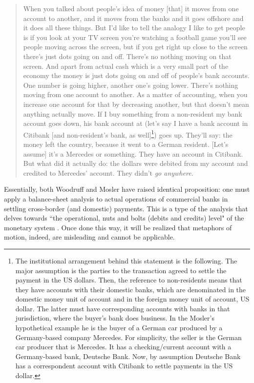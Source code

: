 \begin{quote}
When you talked about people's idea of money [that] it moves from one account to another, and it moves from the banks and it goes offshore and it does all these things. But I'd like to tell the analogy I like to get people is if you look at your TV screen you're watching a football game you'll see people moving across the screen, but if you get right up close to the screen there's just dots going on and off. There's no nothing moving on that screen. And apart from actual cash which is a very small part of the economy the money is just dots going on and off of people's bank accounts. One number is going higher, another one's going lower. There's nothing moving from one account to another. As a matter of accounting, when you increase one account for that by decreasing another, but that doesn't mean anything actually move. If I buy something from a non-resident my bank account goes down, his bank account at (let's say I have a bank account in Citibank [and non-resident's bank, as well]\footnote{The institutional arrangement behind this statement is the following. The major assumption is the parties to the transaction agreed to settle the payment in the US dollars. Then, the reference to non-residents means that they have accounts with their domestic banks, which are denominated in the domestic money unit of account and in the foreign money unit of account, US dollar. The latter must have corresponding accounts with banks in that jurisdiction, where the buyer's bank does business. In the Mosler's hypothetical example he is the buyer of a German car produced by a Germany-based company Mercedes. For simplicity, the seller is the German car producer that is Mercedes. It has a checking/current account with a Germany-based bank, Deutsche Bank. Now, by assumption Deutsche Bank has a correspondent account with Citibank to settle payments in the US dollar.}) goes up. They'll say: the money left the country, because it went to a German resident. [Let's assume] it's a Mercedes or something. They have an account in Citibank. But what did it actually do: the dollars were debited from my account and credited to Mercedes' account. They didn't \textit{go anywhere}. \citep[emphasis added]{mosler2023}
\end{quote}

Essentially, both Woodruff and Mosler have raised identical proposition: one must apply a balance-sheet analysis to actual operations of commercial banks in settling cross-border (and domestic) payments. This is a type of the analysis that delves towards ``the operational, nuts and bolts (debits and credits) level" of the monetary system \citep[p.~36]{mosler2010}. Once done this way, it will be realized that metaphors of motion, indeed, are misleading and cannot be applicable.


